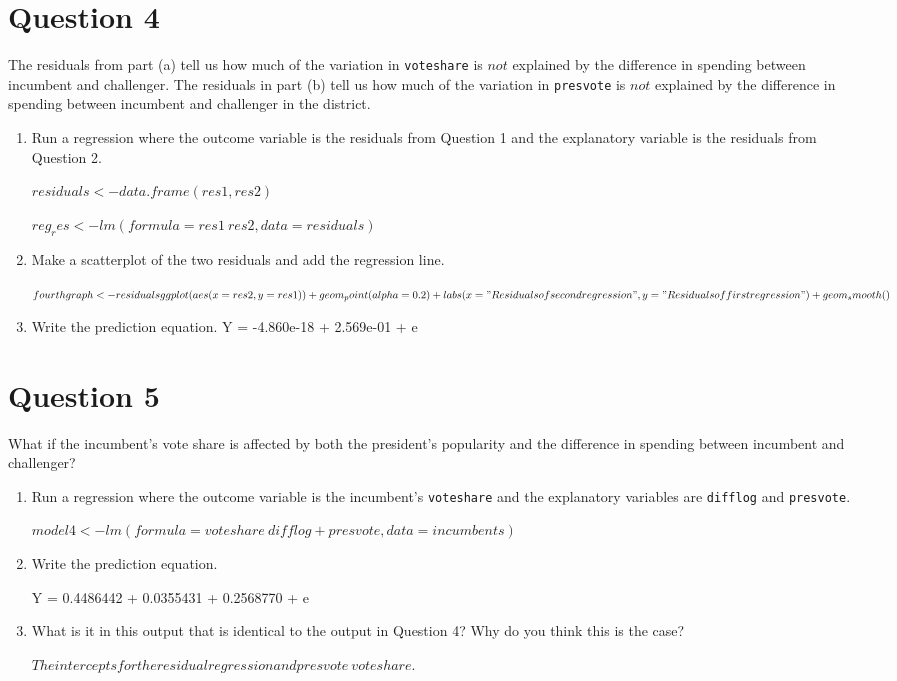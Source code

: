 \documentclass[12pt,letterpaper]{article}
\begin{document}
	
	\newpage	
	\section*{Question 4}
	\noindent The residuals from part (a) tell us how much of the variation in \texttt{voteshare} is $not$ explained by the difference in spending between incumbent and challenger. The residuals in part (b) tell us how much of the variation in \texttt{presvote} is $not$ explained by the difference in spending between incumbent and challenger in the district.
	\begin{enumerate}
		\item Run a regression where the outcome variable is the residuals from Question 1 and the explanatory variable is the residuals from Question 2.	\vspace{6cm}
		
		$residuals <- data.frame(res1, res2)$
		
		$reg_res <- lm(formula = res1~res2, data=residuals)$
		\item 
		Make a scatterplot of the two residuals and add the regression line. 	\vspace{6cm}
		
		$fourthgraph <- residuals %
		ggplot(aes(x=res2, y=res1)) +
		geom_point(alpha=0.2) +
		labs(x="Residuals of second regression",
		y="Residuals of first regression") +
		geom_smooth()$
		\item Write the prediction equation.
		Y = -4.860e-18 + 2.569e-01 + e
	\end{enumerate}
	
	\newpage	
	
	\section*{Question 5}
	\noindent What if the incumbent's vote share is affected by both the president's popularity and the difference in spending between incumbent and challenger? 
	\begin{enumerate}
		\item Run a regression where the outcome variable is the incumbent's \texttt{voteshare} and the explanatory variables are \texttt{difflog} and \texttt{presvote}.	\vspace{5cm}
		
		$model4 <- lm(formula = voteshare ~ difflog + presvote, 
		data=incumbents)$
		\item Write the prediction equation.	\vspace{5cm}
		 
		 Y = 0.4486442 + 0.0355431 + 0.2568770 + e
		\item What is it in this output that is identical to the output in Question 4? Why do you think this is the case?
		
		$The intercepts for the residual regression and presvote~voteshare.$
	\end{enumerate}
	
	
	
	
\end{document}
